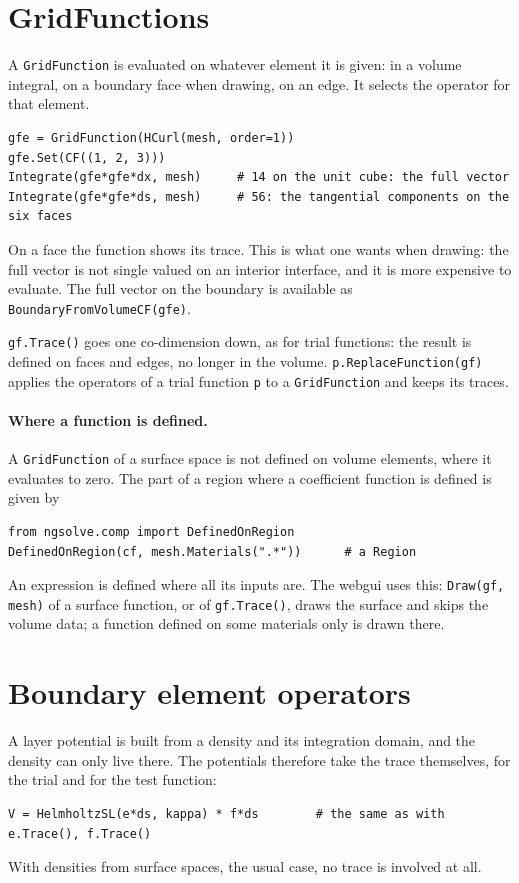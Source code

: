 \documentclass[10pt,a4paper]{article}
\newcommand{\code}[1]{\texttt{#1}}
\begin{document}
\section{GridFunctions}

A \code{GridFunction} is evaluated on whatever element it is given: in a volume integral, on a boundary face when drawing, on an edge. It selects the operator for that element.
\begin{lstlisting}
gfe = GridFunction(HCurl(mesh, order=1))
gfe.Set(CF((1, 2, 3)))
Integrate(gfe*gfe*dx, mesh)     # 14 on the unit cube: the full vector
Integrate(gfe*gfe*ds, mesh)     # 56: the tangential components on the six faces
\end{lstlisting}
On a face the function shows its trace. This is what one wants when drawing: the full vector is not single valued on an interior interface, and it is more expensive to evaluate. The full vector on the boundary is available as \code{BoundaryFromVolumeCF(gfe)}.

\code{gf.Trace()} goes one co-dimension down, as for trial functions: the result is defined on faces and edges, no longer in the volume. \code{p.ReplaceFunction(gf)} applies the operators of a trial function \code{p} to a \code{GridFunction} and keeps its traces.

\paragraph{Where a function is defined.} A \code{GridFunction} of a surface space is not defined on volume elements, where it evaluates to zero. The part of a region where a coefficient function is defined is given by
\begin{lstlisting}[numbers=none,xleftmargin=0pt]
from ngsolve.comp import DefinedOnRegion
DefinedOnRegion(cf, mesh.Materials(".*"))      # a Region
\end{lstlisting}
An expression is defined where all its inputs are. The webgui uses this: \code{Draw(gf, mesh)} of a surface function, or of \code{gf.Trace()}, draws the surface and skips the volume data; a function defined on some materials only is drawn there.

\section{Boundary element operators}

A layer potential is built from a density and its integration domain, and the density can only live there. The potentials therefore take the trace themselves, for the trial and for the test function:
\begin{lstlisting}[numbers=none,xleftmargin=0pt]
V = HelmholtzSL(e*ds, kappa) * f*ds        # the same as with e.Trace(), f.Trace()
\end{lstlisting}
With densities from surface spaces, the usual case, no trace is involved at all.
\end{document}
